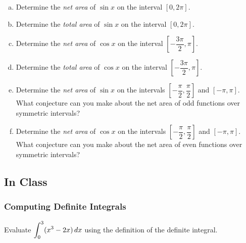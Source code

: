 \documentclass[notes]{subfiles}
\begin{document}
\begin{ex}
\begin{center}
			\end{center}
			\begin{enumerate}[(a)]
				\item Determine the \emph{net area} of \(\sin x\) on the interval \([0,2\pi]\).
					
				\item Determine the \emph{total area} of \(\sin x\) on the interval \([0,2\pi]\).
					
				\item Determine the \emph{net area} of \(\cos x\) on the interval \(\left[-\dfrac{3\pi}{2}, \pi\right]\).
					
				\item Determine the \emph{total area} of \(\cos x\) on the interval \(\left[-\dfrac{3\pi}{2}, \pi\right]\).
					
				\item Determine the \emph{net area} of \(\sin x\) on the intervals \(\left[-\dfrac{\pi}{2},\dfrac{\pi}{2}\right]\) and \([-\pi,\pi]\).  What conjecture can you make about the net area of odd functions over symmetric intervals?
					
				\item Determine the \emph{net area} of \(\cos x\) on the intervals \(\left[-\dfrac{\pi}{2},\dfrac{\pi}{2}\right]\) and \([-\pi,\pi]\).  What conjecture can you make about the net area of even functions over symmetric intervals?
			\end{enumerate}
		\end{ex}
			\newpage
			
	\subsection*{In Class}
	\subsubsection*{Computing Definite Integrals}
		\begin{ex}
			Evaluate \(\displaystyle \int_0^3 (x^3-2x)\,dx\) using the definition of the definite integral.
		\end{ex}
			\newpage
			
\end{document}
